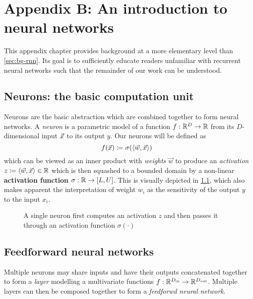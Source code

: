 \chapter{Appendix B: An introduction to neural networks}\label{sec:primer-nn}

\ifpdf
    \graphicspath{{Appendix2/Figs/Raster/}{Appendix2/Figs/PDF/}{Appendix2/Figs/}}
\else
    \graphicspath{{Appendix2/Figs/Vector/}{Appendix2/Figs/}}
\fi

This appendix chapter provides background at a more elementary level than
\vref{sec:bg-rnn}. Its goal is to sufficiently educate readers unfamiliar with
recurrent neural networks such that the remainder of our work can be
understood.

\section{Neurons: the basic computation unit}

Neurons are the basic abstraction which are combined together to form
neural networks. A \emph{neuron} is a parametric model of a function $f : \mathbb{R}^D \to
\mathbb{R}$ from its $D$-dimensional input $\vec{x}$ to its output $y$. Our neurons will be
defined as
\begin{equation}
    f(\vec{x}) \coloneqq \sigma( \langle \vec{w}, \vec{x} \rangle)
\end{equation}
which can be viewed as an inner product with \emph{weights} $\vec{w}$ to
produce an \emph{activation} $z \coloneqq \langle \vec{w}, \vec{x} \rangle
\in \mathbb{R}$ which is then squashed to a bounded domain by a non-linear
\textbf{activation function} $\sigma : \mathbb{R} \to [L, U]$. This is visually
depicted in \cref{fig:nn-single}, which also makes apparent the
interpretation of weight $w_i$ as the sensitivity of the output $y$ to the
input $x_i$.

\begin{figure}[tb]
    \centering
    
    \caption{A single neuron first computes an activation $z$ and then passes it through an activation function $\sigma(\cdot)$}
    \label{fig:nn-single}
\end{figure}

\section{Feedforward neural networks}

Multiple neurons may share inputs and have their outputs concatenated together
to form a \emph{layer} modelling a multivariate functions $f :
\mathbb{R}^{D_\text{in}} \to \mathbb{R}^{D_\text{out}}$. Multiple layers can then
be composed together to form a \emph{feedforwd neural network}.

